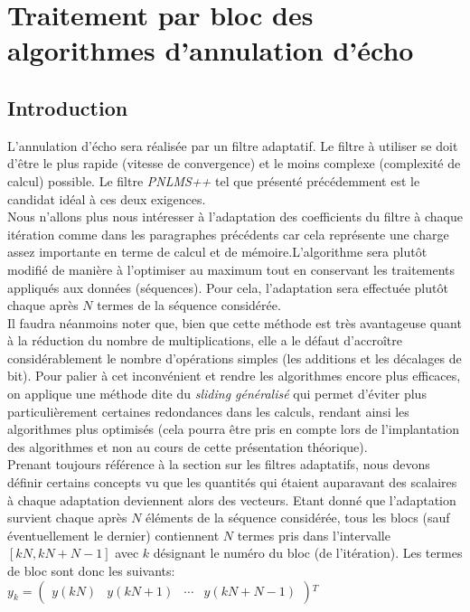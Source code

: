 \section{Traitement par bloc des algorithmes d'annulation d'écho}
\subsection{Introduction}
L'annulation d'écho sera réalisée par un filtre adaptatif. Le filtre à utiliser se doit d'être le plus rapide (vitesse de convergence) et le moins complexe (complexité de calcul) possible. Le filtre \emph{PNLMS++} tel que présenté précédemment est le candidat idéal à ces deux exigences.\\
Nous n'allons plus nous intéresser à l'adaptation des coefficients du filtre à chaque itération comme dans les paragraphes précédents car cela représente une charge assez importante en terme de calcul et de mémoire.L'algorithme sera plutôt modifié de manière à l'optimiser au maximum tout en conservant les traitements appliqués aux données (séquences). Pour cela, l'adaptation sera effectuée plutôt chaque après $ N $ termes de la séquence considérée.\\
Il faudra néanmoins noter que, bien que cette méthode est très avantageuse quant à la réduction du nombre de multiplications, elle a le défaut d'accroître considérablement le nombre d'opérations simples (les additions et les décalages de bit). Pour palier à cet inconvénient et rendre les algorithmes encore plus efficaces, on applique une méthode dite du \emph{sliding généralisé} qui permet d'éviter plus particulièrement certaines redondances dans les calculs, rendant ainsi les algorithmes plus optimisés (cela pourra être pris en compte lors de l'implantation des algorithmes et non au cours de cette présentation théorique).\\
Prenant toujours référence à la section sur les filtres adaptatifs, nous devons définir certains concepts vu que les quantités qui étaient auparavant des scalaires à chaque adaptation deviennent alors des vecteurs. Etant donné que l'adaptation survient chaque après $ N $ éléments de la séquence considérée, tous les blocs (sauf éventuellement le dernier) contiennent $ N $ termes pris dans l'intervalle $ [kN,kN+N-1] $ avec $ k $ désignant le numéro du bloc (de l'itération). Les termes de bloc sont donc les suivants:\\
$ y_{k} = $\(\begin{pmatrix}
y(kN) & y(kN+1) & \cdots & y(kN+N-1)
\end{pmatrix}\)$ ^{T} $\\
